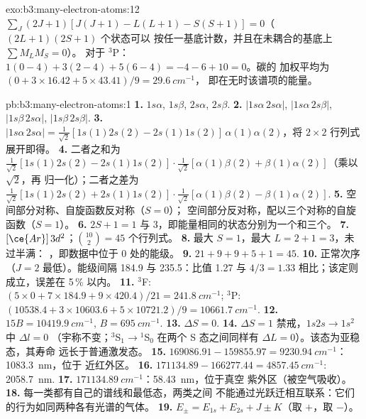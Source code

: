 \begin{solution}{exo:b3:many-electron-atoms:12}
$\sum_J(2J+1)[J(J+1) - L(L+1) - S(S+1)] = 0$（$(2L+1)(2S+1)$ 个状态可以
按任一基底计数，并且在未耦合的基底上 $\sum M_LM_S = 0$）。
对于 ${}^3$P：$1(0 - 4) + 3(2 - 4) + 5(6 - 4) = -4 - 6 + 10 = 0$。碳的
加权平均为 $(0 + 3 \times 16.42 + 5 \times 43.41)/9 = \qty{29.6}{cm^{-1}}$，
即在无时该谱项的能量。
\end{solution}

\begin{solution}{pb:b3:many-electron-atoms:1}
\textbf{1.} $1s\alpha$, $1s\beta$, $2s\alpha$, $2s\beta$.
\textbf{2.} $|1s\alpha\,2s\alpha|$, $|1s\alpha\,2s\beta|$, $|1s\beta\,2s\alpha|$,
$|1s\beta\,2s\beta|$.
\textbf{3.} $|1s\alpha\,2s\alpha| = \frac{1}{\sqrt2}[1s(1)2s(2) - 2s(1)1s(2)]\,
\alpha(1)\alpha(2)$，将 $2\times2$ 行列式展开即得。
\textbf{4.} 二者之和为 $\frac{1}{\sqrt2}[1s(1)2s(2) - 2s(1)1s(2)]\cdot
\frac{1}{\sqrt2}[\alpha(1)\beta(2) + \beta(1)\alpha(2)]$（乘以 $\sqrt2$，再
归一化）；二者之差为 $\frac{1}{\sqrt2}[1s(1)2s(2) +
2s(1)1s(2)]\cdot\frac{1}{\sqrt2}[\alpha(1)\beta(2) - \beta(1)\alpha(2)]$.
\textbf{5.} 空间部分对称、自旋函数反对称（$S = 0$）；
空间部分反对称，配以三个对称的自旋函数（$S = 1$）。
\textbf{6.} $2S + 1 = 1$ 与 3，即能量相同的状态分别为一个和三个。
\textbf{7.} $[\ce{Ar}]\,3d^2$；$\binom{10}{2} = 45$ 个行列式。
\textbf{8.} 最大 $S = 1$，最大 $L = 2 + 1 = 3$，未过半满：
，即数据中位于 0 处的能级。
\textbf{9.} $21 + 9 + 9 + 5 + 1 = 45$.
\textbf{10.} 正常次序（$J = 2$ 最低）。能级间隔 184.9 与 235.5：比值 1.27
与 $4/3 = 1.33$ 相比；该定则成立，误差在 5\,\% 以内。
\textbf{11.} ${}^3$F: $(5 \times 0 + 7 \times 184.9 + 9 \times 420.4)/21 =
\qty{241.8}{cm^{-1}}$; ${}^3$P: $(10538.4 + 3 \times 10603.6 + 5 \times
10721.2)/9 = \qty{10661.7}{cm^{-1}}$.
\textbf{12.} $15B = \qty{10419.9}{cm^{-1}}$, $B = \qty{695}{cm^{-1}}$.
\textbf{13.} $\Delta S = 0$.
\textbf{14.} $\Delta S = 1$ 禁戒，$1s2s \to 1s^2$ 中 $\Delta l = 0$
（宇称不变；${}^3$S$_1 \to {}^1$S$_0$ 在两个 S
态之间同样有 $\Delta L = 0$）。该态为亚稳态，其寿命
远长于普通激发态。
\textbf{15.} $169086.91 - 159855.97 = \qty{9230.94}{cm^{-1}}$：\qty{1083.3}{nm}，位于
近红外区。
\textbf{16.} $171134.89 - 166277.44 = \qty{4857.45}{cm^{-1}}$: \qty{2058.7}{nm}.
\textbf{17.} $\qty{171134.89}{cm^{-1}}$：\qty{58.43}{nm}，位于真空
紫外区（被空气吸收）。
\textbf{18.} 每一类都有自己的谱线和最低态，两类之间
不能通过光跃迁相互联系：它们的行为如同两种各有光谱的气体。
\textbf{19.} $E_\pm = E_{1s} + E_{2s} + J \pm K$（取 $+$，取 $-$）。

\end{solution}
